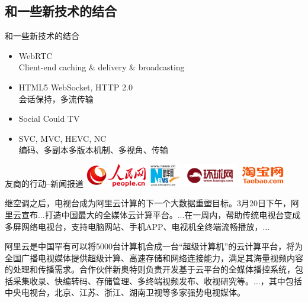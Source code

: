 \documentclass{beamer}
\begin{document}
\subsection{和一些新技术的结合}
\begin{frame}{和一些新技术的结合}
\begin{itemize}
\item WebRTC\\
Client-end caching \& delivery \& broadcasting
\item HTML5 WebSocket, HTTP 2.0\\
会话保持，多流传输
\item Social Could TV\\
\item SVC, MVC, HEVC, NC\\
编码、多副本多版本机制、多视角、传输
\end{itemize}
\end{frame}
\begin{frame}{友商的行动--新闻报道}
\includegraphics[height=1.0cm]{fig/rmw_logo.jpg}
\includegraphics[height=1.0cm]{fig/xinhua_logo.jpg}
\includegraphics[height=1.0cm]{fig/huanqiu_logo.jpg}
\includegraphics[height=1.0cm]{fig/taobao_logo.jpg}\\\pause
\small{
继空调之后，电视台成为阿里云计算的下一个大数据重塑目标。3月20日下午，阿里云宣布...打造中国最大的全媒体云计算平台。...在一周内，帮助传统电视台变成多屏网络电视台，支持电脑网站、手机APP、电视机全终端流畅播放，...

阿里云是中国罕有可以将5000台计算机合成一台“超级计算机”的云计算平台，将为全国广播电视媒体提供超级计算、高速存储和网络连接能力，满足其海量视频内容的处理和传播需求。合作伙伴新奥特则负责开发基于云平台的全媒体播控系统，包括采集收录、快编转码、存储管理、多终端视频发布、收视研究等。...，其中包括中央电视台，北京、江苏、浙江、湖南卫视等多家强势电视媒体。
}
\end{frame}
\end{document}
